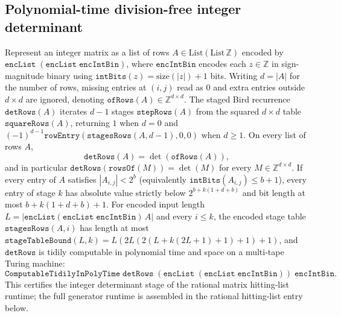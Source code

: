 \begin{result}
\subsection{Polynomial-time division-free integer determinant}
Represent an integer matrix as a list of rows $A\in\mathrm{List}(\mathrm{List}\,\mathbb Z)$ encoded by
$\texttt{encList}\;(\texttt{encList}\;\texttt{encIntBin})$, where $\texttt{encIntBin}$ encodes each
$z\in\mathbb Z$ in sign-magnitude binary using $\texttt{intBits}(z)=\mathrm{size}(|z|)+1$ bits.
Writing $d=|A|$ for the number of rows, missing entries at $(i,j)$ read as $0$ and extra entries outside
$d\times d$ are ignored, denoting $\texttt{ofRows}(A)\in\mathbb Z^{d\times d}$. The staged Bird recurrence
$\texttt{detRows}(A)$ iterates $d-1$ stages $\texttt{stepRows}(A)$ from the squared $d\times d$ table
$\texttt{squareRows}(A)$, returning $1$ when $d=0$ and
$(-1)^{d-1}\texttt{rowEntry}(\texttt{stagesRows}(A,d-1),0,0)$ when $d\ge 1$. On every list of rows $A$,
\[
\texttt{detRows}(A)=\det(\texttt{ofRows}(A)),
\]
and in particular $\texttt{detRows}(\texttt{rowsOf}(M))=\det(M)$ for every $M\in\mathbb Z^{d\times d}$.
If every entry of $A$ satisfies $|A_{i,j}|<2^b$ (equivalently $\texttt{intBits}(A_{i,j})\le b+1$), every
entry of stage $k$ has absolute value strictly below $2^{b+k(1+d+b)}$ and bit length at most
$b+k(1+d+b)+1$. For encoded input length $L=|\texttt{encList}(\texttt{encList}\;\texttt{encIntBin})\,A|$ and every
$i\le k$, the encoded stage table $\texttt{stagesRows}(A,i)$ has length at most
$\texttt{stageTableBound}(L,k)=L(2L(2(L+k(2L+1)+1)+1)+1)$, and $\texttt{detRows}$ is tidily computable in
polynomial time and space on a multi-tape Turing machine:
\[
\texttt{ComputableTidilyInPolyTime}\;\texttt{detRows}\;(\texttt{encList}\;(\texttt{encList}\;\texttt{encIntBin}))\;\texttt{encIntBin}.
\]
This certifies the integer determinant stage of the rational matrix hitting-list runtime; the
full generator runtime is assembled in the rational hitting-list entry below.\citep{Bird2011,OpenAI2026RationalHitting,Schlesinger2026RationalHitting}

\end{result}
